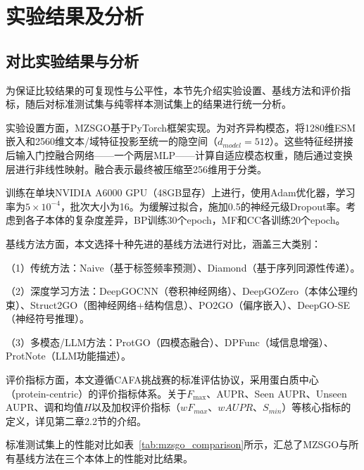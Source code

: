 \section{实验结果及分析}

\subsection{对比实验结果与分析}

为保证比较结果的可复现性与公平性，本节先介绍实验设置、基线方法和评价指标，随后对标准测试集与纯零样本测试集上的结果进行统一分析。

实验设置方面，MZSGO基于PyTorch\cite{paszke2019pytorch}框架实现。为对齐异构模态，将1280维ESM嵌入和2560维文本/域特征投影至统一的隐空间（$d_{model} = 512$）。这些特征经拼接后输入门控融合网络——一个两层MLP——计算自适应模态权重，随后通过变换层进行非线性映射。融合表示最终被压缩至256维用于分类。

训练在单块NVIDIA A6000 GPU（48GB显存）上进行，使用Adam优化器\cite{kingma2014adam}，学习率为$5 \times 10^{-4}$，批次大小为16。为缓解过拟合，施加0.5的神经元级Dropout率。考虑到各子本体的复杂度差异，BP训练30个epoch，MF和CC各训练20个epoch。

基线方法方面，本文选择十种先进的基线方法进行对比，涵盖三大类别：

（1）传统方法：Naive（基于标签频率预测）、Diamond\cite{diamond}（基于序列同源性传递）。

（2）深度学习方法：DeepGOCNN\cite{kulmanov2020deepgoplus}（卷积神经网络）、DeepGOZero\cite{kulmanov2022deepgozero}（本体公理约束）、Struct2GO\cite{jiao2023struct2go}（图神经网络+结构信息）、PO2GO\cite{li2024partial}（偏序嵌入）、DeepGO-SE\cite{kulmanov2024protein}（神经符号推理）。

（3）多模态/LLM方法：ProtGO\cite{wang2025protgo}（四模态融合）、DPFunc\cite{wang2025dpfunc}（域信息增强）、ProtNote\cite{char2025protnote}（LLM功能描述）。

评价指标方面，本文遵循CAFA挑战赛\cite{zhou2019cafa}的标准评估协议，采用蛋白质中心（protein-centric）的评价指标体系。关于$F_{\max}$、AUPR、Seen AUPR、Unseen AUPR、调和均值$H$以及加权评价指标（$wF_{max}$、$wAUPR$、$S_{min}$）等核心指标的定义，详见第二章2.2节的介绍。

标准测试集上的性能对比如表~\ref{tab:mzsgo_comparison}所示，汇总了MZSGO与所有基线方法在三个本体上的性能对比结果。

